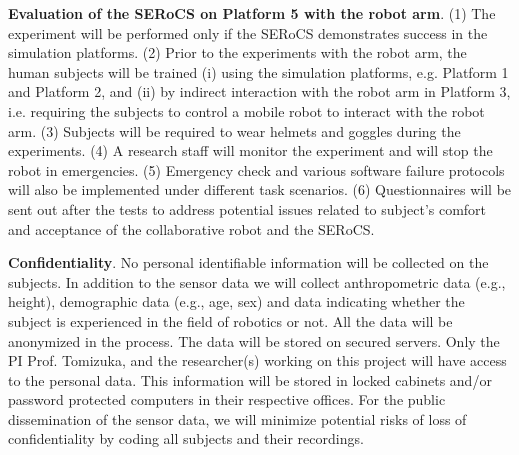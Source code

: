 \textbf{Evaluation of the SERoCS on Platform 5 with the robot arm}. 
(1) The experiment will be performed only if the SERoCS demonstrates success in the simulation platforms. (2) Prior to the experiments with the robot arm, the human subjects will be trained (i) using the simulation platforms, e.g. Platform 1 and Platform 2, and (ii) by indirect interaction with the robot arm in Platform 3, i.e. requiring the subjects to control a mobile robot to interact with the robot arm. (3) Subjects will be required to wear helmets and goggles during the experiments. (4) A research staff will monitor the experiment and will stop the robot in emergencies.
(5) Emergency check and various software failure protocols will also be implemented under different task scenarios. (6) Questionnaires will be sent out after the tests to address potential issues related to subject's comfort and acceptance of the collaborative robot and the SERoCS.

\textbf{Confidentiality}. No personal identifiable information will be collected on the subjects. In addition to the sensor data we will collect anthropometric data (e.g., height), demographic data (e.g., age, sex) and data indicating whether the subject is experienced in the field of robotics or not. All the data will be anonymized in the process. The data will be stored on secured servers. Only the PI Prof. Tomizuka, and the researcher(s) working on this project will have access to the personal data. This information will be stored in locked cabinets and/or password protected computers in their respective offices. For the public dissemination of the sensor data, we will minimize potential risks of loss of confidentiality by coding all subjects and their recordings.





